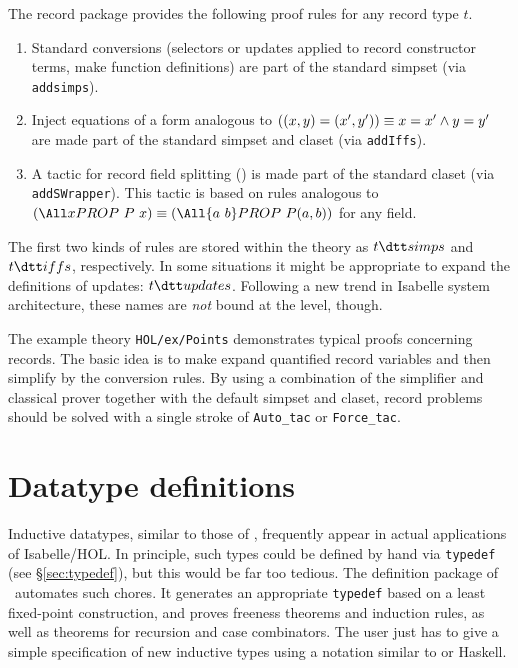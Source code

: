 The record package provides the following proof rules for any record type $t$.
\begin{enumerate}
  
\item Standard conversions (selectors or updates applied to record constructor
  terms, make function definitions) are part of the standard simpset (via
  \texttt{addsimps}).
  
\item Inject equations of a form analogous to $((x, y) = (x', y')) \equiv x=x'
  \wedge y=y'$ are made part of the standard simpset and claset (via
  \texttt{addIffs}).
  
\item A tactic for record field splitting () is made
  part of the standard claset (via \texttt{addSWrapper}).  This tactic is
  based on rules analogous to $(\All x PROP~P~x) \equiv (\All{a~b} PROP~P(a,
  b))$ for any field.
\end{enumerate}

The first two kinds of rules are stored within the theory as $t\dtt simps$ and
$t\dtt iffs$, respectively.  In some situations it might be appropriate to
expand the definitions of updates: $t\dtt updates$.  Following a new trend in
Isabelle system architecture, these names are \emph{not} bound at the {\ML}
level, though.

\medskip

The example theory \texttt{HOL/ex/Points} demonstrates typical proofs
concerning records.  The basic idea is to make 
expand quantified record variables and then simplify by the conversion rules.
By using a combination of the simplifier and classical prover together with
the default simpset and claset, record problems should be solved with a single
stroke of \texttt{Auto_tac} or \texttt{Force_tac}.


\section{Datatype definitions}
\label{sec:HOL:datatype}

Inductive datatypes, similar to those of \ML, frequently appear in actual
applications of Isabelle/HOL.  In principle, such types could be defined by
hand via \texttt{typedef} (see \S\ref{sec:typedef}), but this would be far too
tedious.  The  definition package of \HOL\ automates such
chores.  It generates an appropriate \texttt{typedef} based on a least
fixed-point construction, and proves freeness theorems and induction rules, as
well as theorems for recursion and case combinators.  The user just has to
give a simple specification of new inductive types using a notation similar to
{\ML} or Haskell.

